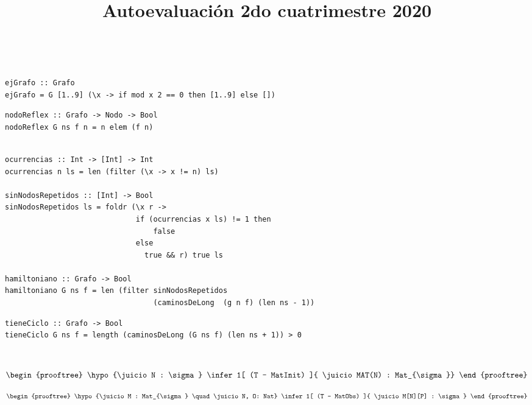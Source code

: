 \documentclass[leqno, 12pt, twoside, letterpaper]{book}
\date{\vspace{-5ex}}
\title{Autoevaluación 2do cuatrimestre 2020}
\begin{document}
\maketitle
\tableofcontents

\newpage

\\


\begin{verbatim}
ejGrafo :: Grafo
ejGrafo = G [1..9] (\x -> if mod x 2 == 0 then [1..9] else [])
\end{verbatim}

\begin{verbatim}
nodoReflex :: Grafo -> Nodo -> Bool
nodoReflex G ns f n = n elem (f n)
\end{verbatim}

\begin{verbatim}

ocurrencias :: Int -> [Int] -> Int
ocurrencias n ls = len (filter (\x -> x != n) ls)

sinNodosRepetidos :: [Int] -> Bool
sinNodosRepetidos ls = foldr (\x r ->
                              if (ocurrencias x ls) != 1 then
                                  false
                              else
                                true && r) true ls

hamiltoniano :: Grafo -> Bool
hamiltoniano G ns f = len (filter sinNodosRepetidos
                                  (caminosDeLong  (g n f) (len ns - 1))
\end{verbatim}

\begin{verbatim}
tieneCiclo :: Grafo -> Bool
tieneCiclo G ns f = length (caminosDeLong (G ns f) (len ns + 1)) > 0
\end{verbatim}

\newpage

\\


\[
\begin{prooftree}
    \hypo{\juicio N : \sigma}
    \infer1[ (T - MatInit) ]{ \juicio MAT(N) : Mat_{\sigma}}
\end{prooftree}
\]

\hfill

\[
\begin{prooftree}
    \hypo{\juicio M : Mat_{\sigma} \quad  \juicio N, O: Nat}
    \infer1[ (T - MatObs) ]{ \juicio M[N][P] : \sigma}
\end{prooftree}
\]
\end{document}
